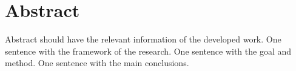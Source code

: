 \chapter{Abstract}
Abstract should have the relevant information of the developed work. One sentence with the framework of the research. One sentence with the goal and method. One sentence with the main conclusions.

\vspace{0.5cm} %

